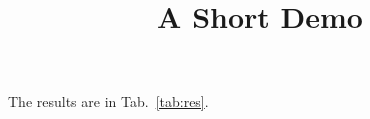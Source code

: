 \documentclass[article]{jss}
\title{A Short Demo}
\begin{document}
The results are in Tab.~\ref{tab:res}.
\end{document}

